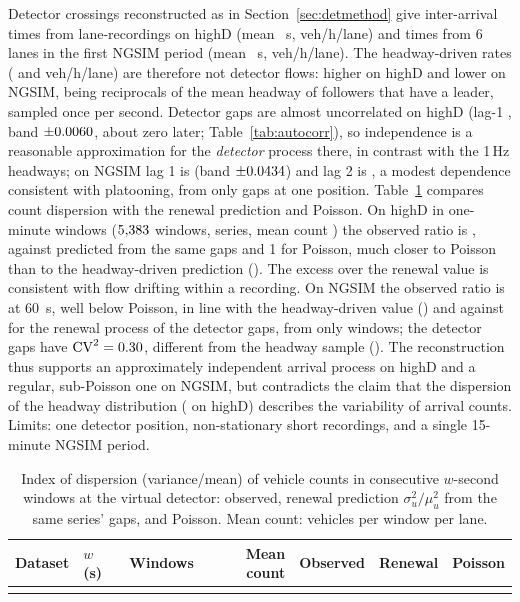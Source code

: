 \documentclass[10pt,a4paper]{article}
\numberwithin{equation}{section}
\begin{document}
Detector crossings reconstructed as in Section~\ref{sec:detmethod} give \hdDetN{} inter-arrival times from \hdDetUnits{} lane-recordings on highD (mean \hdDetMean~s, \hdDetFlow{} veh/h/lane) and \ngDetN{} times from 6 lanes in the first NGSIM period (mean \ngDetMean~s, \ngDetFlow{} veh/h/lane).
The headway-driven rates (\hdFlow{} and \ngFlow{} veh/h/lane) are therefore not detector flows: higher on highD and lower on NGSIM, being reciprocals of the mean headway of followers that have a leader, sampled once per second. Detector gaps are almost uncorrelated on highD (lag-1 \hdDetLagOne{}, band $\pm0.0060$, about zero later; Table~\ref{tab:autocorr}),
so independence is a reasonable approximation for the \emph{detector} process there, in contrast with the 1\,Hz headways; on NGSIM lag 1 is \ngDetLagOne{} (band $\pm0.0434$) and lag 2 is \ngDetLagTwo{}, a modest dependence consistent with platooning, from only \ngDetN{} gaps at one position.
Table~\ref{tab:detcounts} compares count dispersion with the renewal prediction and Poisson. On highD in one-minute windows ($5{,}383$ windows, \hdDetSeries{} series, mean count \hdDetMeanCount) the observed ratio is \hdDetFanoObs, against \hdDetFanoRen{} predicted from the same gaps and 1 for Poisson, much closer to Poisson than to the headway-driven prediction (\hdCV).
The excess over the renewal value is consistent with flow drifting within a recording. On NGSIM the observed ratio is \ngDetFanoObs{} at 60~s, well below Poisson, in line with the headway-driven value (\ngCV) and against \ngDetFanoRen{} for the renewal process of the detector gaps, from only \ngDetWindows{} windows; the detector gaps have $\mathrm{CV}^2=0.30$, different from the headway sample (\ngCV).
The reconstruction thus supports an approximately independent arrival process on highD and a regular, sub-Poisson one on NGSIM, but contradicts the claim that the dispersion of the headway distribution (\hdCV{} on highD) describes the variability of arrival counts. Limits: one detector position, non-stationary short recordings, and a single 15-minute NGSIM period.

\begin{table}[H]
\centering\small
\caption{Index of dispersion (variance/mean) of vehicle counts in consecutive $w$-second windows at the virtual detector: observed, renewal prediction $\sigma_u^2/\mu_u^2$ from the same series' gaps, and Poisson. Mean count: vehicles per window per lane.}
\label{tab:detcounts}
\begin{tabular}{@{}llrrrrr@{}}
\toprule
Dataset & $w$ (s) & Windows & Mean count & Observed & Renewal & Poisson \\
\midrule
\\
\bottomrule
\end{tabular}
\end{table}
\end{document}

